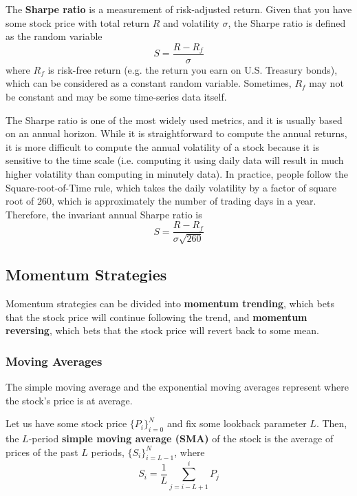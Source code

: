 \documentclass{article}
\begin{document}
    \begin{definition}
      The \textbf{Sharpe ratio} is a measurement of risk-adjusted return. Given that you have some stock price with total return $R$ and volatility $\sigma$, the Sharpe ratio is defined as the random variable
      \[S = \frac{R - R_f}{\sigma}\]
      where $R_f$ is risk-free return (e.g. the return you earn on U.S. Treasury bonds), which can be considered as a constant random variable. Sometimes, $R_f$ may not be constant and may be some time-series data itself. 
    \end{definition}

    The Sharpe ratio is one of the most widely used metrics, and it is usually based on an annual horizon. While it is straightforward to compute the annual returns, it is more difficult to compute the annual volatility of a stock because it is sensitive to the time scale (i.e. computing it using daily data will result in much higher volatility than computing in minutely data). In practice, people follow the Square-root-of-Time rule, which takes the daily volatility by a factor of square root of $260$, which is approximately the number of trading days in a year. Therefore, the invariant annual Sharpe ratio is 
    \begin{equation}
      S = \frac{R - R_f}{\sigma \sqrt{260}}
    \end{equation}

  \subsection{Momentum Strategies}

    Momentum strategies can be divided into \textbf{momentum trending}, which bets that the stock price will continue following the trend, and \textbf{momentum reversing}, which bets that the stock price will revert back to some mean. 

    \subsubsection{Moving Averages}

      The simple moving average and the exponential moving averages represent where the stock's price is at average. 

      \begin{definition}
        Let us have some stock price $\{P_i\}_{i=0}^N$ and fix some lookback parameter $L$. Then, the $L$-period \textbf{simple moving average (SMA)} of the stock is the average of prices of the past $L$ periods, $\{S_i\}_{i=L-1}^N$, where 
        \[S_i = \frac{1}{L} \sum_{j=i-L + 1}^i P_j\]
      \end{definition}
\end{document}
